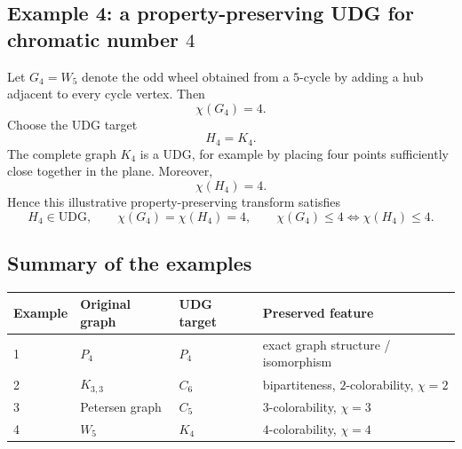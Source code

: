 \documentclass[11pt]{article}
\newcommand{\UDG}{\mathrm{UDG}}
\begin{document}
\subsection{Example 4: a property-preserving UDG for chromatic number $4$}

Let $G_4=W_5$ denote the odd wheel obtained from a $5$-cycle by adding a hub adjacent to every cycle vertex. Then
\[
\chi(G_4)=4.
\]
Choose the UDG target
\[
H_4=K_4.
\]
The complete graph $K_4$ is a UDG, for example by placing four points sufficiently close together in the plane. Moreover,
\[
\chi(H_4)=4.
\]
Hence this illustrative property-preserving transform satisfies
\[
H_4\in\UDG,
\qquad
\chi(G_4)=\chi(H_4)=4,
\qquad
\chi(G_4)\le 4 \iff \chi(H_4)\le 4.
\]

\begin{center}
\end{center}

\subsection{Summary of the examples}

\begin{center}
\begin{tabular}{@{}llll@{}}
\toprule
Example & Original graph & UDG target & Preserved feature \\
\midrule
1 & $P_4$ & $P_4$ & exact graph structure / isomorphism \\
2 & $K_{3,3}$ & $C_6$ & bipartiteness, $2$-colorability, $\chi=2$ \\
3 & Petersen graph & $C_5$ & $3$-colorability, $\chi=3$ \\
4 & $W_5$ & $K_4$ & $4$-colorability, $\chi=4$ \\
\bottomrule
\end{tabular}
\end{center}
\end{document}
